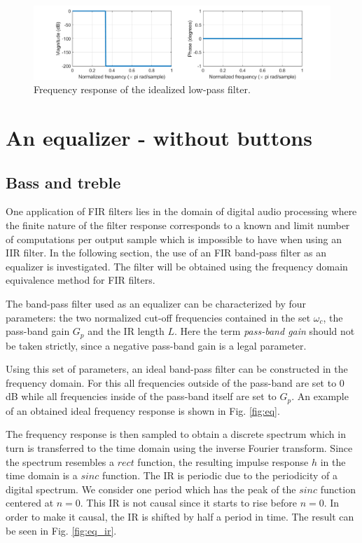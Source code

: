 \documentclass[journal]{IEEEtran}
\begin{document}
\begin{figure}
    \centering
    \includegraphics[width=\columnwidth]{assignment_02/plots/freq_resp_lowpass_fir.png}
    \caption{Frequency response of the idealized low-pass filter.}
    \label{fig:freq_resp_lowpass}
\end{figure}


\newpage

\section{An equalizer - without buttons}
\subsection{Bass and treble}

One application of FIR filters lies in the domain of digital audio processing where the finite nature of the filter response corresponds to a known and limit number of computations per output sample which is impossible to have when using an IIR filter. In the following section, the use of an FIR band-pass filter as an equalizer is investigated. The filter will be obtained using the frequency domain equivalence method for FIR filters.

The band-pass filter used as an equalizer can be characterized by four parameters: the two normalized cut-off frequencies contained in the set $\omega_c$, the pass-band gain $G_p$ and the IR length $L$. Here the term \textit{pass-band gain} should not be taken strictly, since a negative pass-band gain is a legal parameter.

Using this set of parameters, an ideal band-pass filter can be constructed in the frequency domain. For this all frequencies outside of the pass-band are set to 0 dB while all frequencies inside of the pass-band itself are set to $G_p$. An example of an obtained ideal frequency response is shown in Fig. \ref{fig:eq}.

The frequency response is then sampled to obtain a discrete spectrum which in turn is transferred to the time domain using the inverse Fourier transform. Since the spectrum resembles a $rect$ function, the resulting impulse response $h$ in the time domain is a $sinc$ function. The IR is periodic due to the periodicity of a digital spectrum. We consider one period which has the peak of the $sinc$ function centered at $n=0$. This IR is not causal since it starts to rise before $n=0$. In order to make it causal, the IR is shifted by half a period in time. The result can be seen in Fig. \ref{fig:eq_ir}. 
\end{document}
